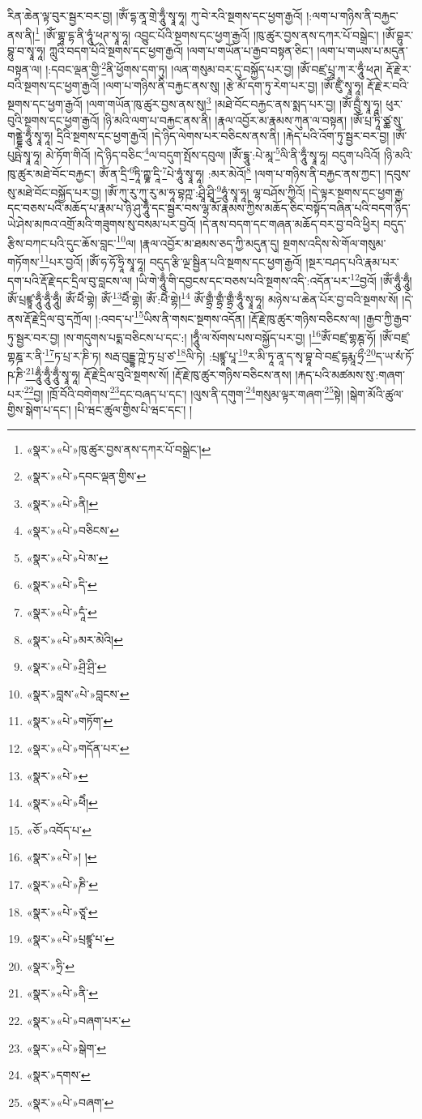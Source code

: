 རིན་ཆེན་ལྟ་བུར་སྦྱར་བར་བྱ། །ཨོཾ་དྷ་ནཱ་གྲེ་ཧཱུྃ་སྭཱ་ཧཱ། ཀུ་བེ་རའི་སྔགས་དང་ཕྱག་རྒྱའོ། །:ལག་པ་གཉིས་ནི་བརྐྱང་ནས་ནི།\footnote{«སྣར་»«པེ་»ཁུ་ཚུར་བྱས་ནས་དཀར་པོ་བསྒྲེང་།} །ཨོཾ་གྷཱ་དྷ་ནི་ཧཱུཾ་ཕཊ་སྭཱ་ཧཱ། འབྱུང་པོའི་སྔགས་དང་ཕྱག་རྒྱའོ། །ཁུ་ཚུར་བྱས་ནས་དཀར་པོ་བསྒྲེང་། །ཨོཾ་བྷུར་བྷུ་བ་སྭཱ་ཧཱ། ཀླུའི་བདག་པོའི་སྔགས་དང་ཕྱག་རྒྱའོ། །ལག་པ་གཡོན་པ་རྒྱབ་བསྟན་ཅིང་། །ལག་པ་གཡས་པ་མདུན་བསྟན་ལ། །:དབང་ལྡན་གྱི་\footnote{«སྣར་»«པེ་»དབང་ལྡན་གྱིས་}ནི་ཕྱོགས་དག་ཏུ། །ལན་གསུམ་བར་དུ་བསྐྱོད་པར་བྱ། །ཨོཾ་བཛྲ་པྲཱ་ཀ་ར་ཧཱུྃ་ཕཊ། རྡོ་རྗེ་ར་བའི་སྔགས་དང་ཕྱག་རྒྱའོ། །ལག་པ་གཉིས་ནི་བརྐྱང་ནས་སུ། །རྩེ་མོ་དག་ཏུ་རེག་པར་བྱ། །ཨོཾ་ཛུྃ་སྭཱ་ཧཱ། རྡོ་རྗེ་ར་བའི་སྔགས་དང་ཕྱག་རྒྱའོ། །ལག་གཡོན་ཁུ་ཚུར་བྱས་ནས་སུ།\footnote{«སྣར་»«པེ་»ནི།} །མཐེ་བོང་བརྐྱང་ནས་སྨད་པར་བྱ། །ཨོཾ་བྲུྃ་སྭཱ་ཧཱ། ཕུར་བུའི་སྔགས་དང་ཕྱག་རྒྱའོ། །ཉི་མའི་ལག་པ་བརྐྱང་ནས་ནི། །རྣལ་འབྱོར་མ་རྣམས་ཀུན་ལ་བསྟན། །ཨོཾ་པྲ་ཏཱི་ཙྪ་སུ་གནྡྷེ་ཧཱུྃ་སྭཱ་ཧཱ། དྲིའི་སྔགས་དང་ཕྱག་རྒྱའོ། །དེ་ཉིད་ལེགས་པར་བཅིངས་ནས་ནི། །རྐེད་པའི་འོག་ཏུ་སྦྱར་བར་བྱ། །ཨོཾ་པུཥྤེ་སྭཱ་ཧཱ། མེ་ཏོག་གིའོ། །དེ་ཉིད་བཅིང་\footnote{«སྣར་»«པེ་»བཅིངས་}ལ་བདུག་སྤོས་དབུལ། །ཨོཾ་དྷཱུ་:པེ་མཱ་\footnote{«སྣར་»«པེ་»པེ་མ་}ལི་ནི་ཧཱུྃ་སྭཱ་ཧཱ། བདུག་པའིའོ། །ཉི་མའི་ཁུ་ཚུར་མཐེ་བོང་བརྐྱང་། ཨོཾ་ན་དྲི་\footnote{«སྣར་»«པེ་»དི་}ཏཱི་ཀྵྞ་དཱི་\footnote{«སྣར་»«པེ་»དཱཾ་}པེ་ཧཱུཾ་སྭཱ་ཧཱ། :མར་མེའོ།\footnote{«སྣར་»«པེ་»མར་མེའི།} །ལག་པ་གཉིས་ནི་བརྐྱང་ནས་ཀྱང་། །དབུས་སུ་མཐེ་བོང་བསྐྱོད་པར་བྱ། །ཨོཾ་ཀུ་རུ་ཀུ་རུ་མ་ཧཱ་བྷཀྵ་:ཤྲཱི་ཤྲཱི་\footnote{«སྣར་»«པེ་»ཤྲི་ཤྲི་}ཧཱུཾ་སྭཱ་ཧཱ། ལྷ་བཤོས་ཀྱིའོ། །དེ་ལྟར་སྔགས་དང་ཕྱག་རྒྱ་དང་བཅས་པའི་མཆོད་པ་རྣམ་པ་ཉི་ཤུ་ཧཱུྃ་དང་སྦྱར་བས་ལྷ་མོ་རྣམས་ཀྱིས་མཆོད་ཅིང་བསྟོད་བཞིན་པའི་བདག་ཉིད་ཡེ་ཤེས་མཁའ་འགྲོ་མའི་གཟུགས་སུ་བསམ་པར་བྱའོ། །དེ་ནས་བདག་དང་གཞན་མཆོད་བར་བྱ་བའི་ཕྱིར། བདུད་རྩིས་བཀང་པའི་དུང་ཆོས་བླང་\footnote{«སྣར་»བླས་«པེ་»བླངས་}ལ། །རྣལ་འབྱོར་མ་ཐམས་ཅད་ཀྱི་མདུན་དུ། སྔགས་འདིས་སེ་གོལ་གསུམ་གཏོགས་\footnote{«སྣར་»«པེ་»གཏོག་}པར་བྱའོ། །ཨོཾ་ཧ་ཧོ་ཧྲཱི་སྭཱ་ཧཱ། བདུད་རྩི་ལྔ་སྦྱིན་པའི་སྔགས་དང་ཕྱག་རྒྱའོ། །སྔར་བཤད་པའི་རྣམ་པར་དག་པའི་རྡོ་རྗེ་དང་དྲིལ་བུ་བླངས་ལ། །ཡི་གེ་ཧཱུྃ་གི་དབྱངས་དང་བཅས་པའི་སྔགས་འདི་:འདོན་པར་\footnote{«སྣར་»«པེ་»གདོན་པར་}བྱའོ། །ཨོཾ་ཧཱུྃ་ཧཱུྃ། ཨོཾ་པྲཛྙཱ་ཧཱུྃ་ཧཱུྃ་ཧཱུྃ། ཨོཾ་ཕཻཾ་གྷེ། ཨོཾ་\footnote{«སྣར་»«པེ་»}ཕཻཾ་གྷེ། ཨོཾ་:ཕཻཾ་གྷེ།\footnote{«སྣར་»«པེ་»ཕཻཾ།} ཨོཾ་གྷྲྃ་གྷྲྃ་གྷྲྃ་ཧཱུྃ་སྭཱ་ཧཱ། མཉེས་པ་ཆེན་པོར་བྱ་བའི་སྔགས་སོ། །དེ་ནས་རྡོ་རྗེ་དྲིལ་བུ་དཀྲོལ། །:འབད་པ་\footnote{«ཅོ་»འབོད་པ་}ཡིས་ནི་གསང་སྔགས་འདོན། །རྡོ་རྗེ་ཁུ་ཚུར་གཉིས་བཅིངས་ལ། །རྒྱབ་ཀྱི་རྒྱབ་ཏུ་སྦྱར་བར་བྱ། །ས་གདུགས་པདྨ་བཅིངས་པ་དང་:། །ཧཱུྃ་ལ་སོགས་པས་བསྐྱོད་པར་བྱ། །\footnote{«སྣར་»«པེ་»། །}ཨོཾ་བཛྲ་གྷཎྚ་ཧོ། །ཨོཾ་བཛྲ་གྷཎྜ་ར་ནི་\footnote{«སྣར་»«པེ་»ཎི་}ཏ་པྲ་ར་ཎི་ཏ། སརྦ་བུདྡྷ་ཀྵེ་ཏྲ་པྲ་ཙ་\footnote{«སྣར་»«པེ་»ཙཱ་}ལི་ཏེ། :པྲཛྙཱ་པཱ་\footnote{«སྣར་»«པེ་»པྲཛྙཱ་པ་}ར་མི་ཏཱ་ནཱ་ད་སྭ་བྷཱ་བེ་བཛྲ་དྷརྨཱ་ཧྲྀ་\footnote{«སྣར་»ཧྲི་}ད་ཡ་སཾ་ཏོ་ཥ་ཎི་\footnote{«སྣར་»«པེ་»ནི་}ཧཱུྃ་ཧཱུྃ་ཧཱུྃ་སྭཱ་ཧཱ། རྡོ་རྗེ་དྲིལ་བུའི་སྔགས་སོ། །རྡོ་རྗེ་ཁུ་ཚུར་གཉིས་བཅིངས་ནས། །རྐད་པའི་མཚམས་སུ་:གཞག་པར་\footnote{«སྣར་»«པེ་»བཞག་པར་}བྱ། །ཁྲོ་བོའི་བགེགས་\footnote{«སྣར་»«པེ་»སྒེག་}དང་བཞད་པ་དང་། །ལུས་ནི་དགུག་\footnote{«སྣར་»དགས་}གསུམ་ལྟར་གཞག་\footnote{«སྣར་»«པེ་»བཞག་}སྟེ། །སྒེག་མོའི་ཚུལ་གྱིས་སྒེག་པ་དང་། །པི་ཝང་ཚུལ་གྱིས་པི་ཝང་དང་། །
